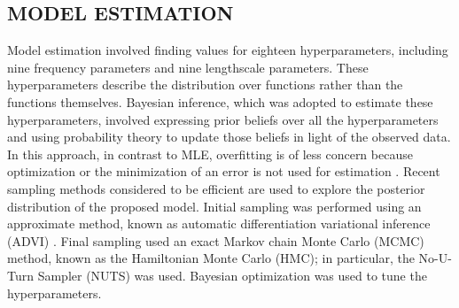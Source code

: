 \documentclass[letterpaper]{article}
\begin{document}

\subsection{MODEL ESTIMATION}\label{model-estimation}

Model estimation involved finding values for eighteen hyperparameters, including nine frequency parameters and nine lengthscale parameters. These hyperparameters describe the distribution over functions rather than the functions themselves. Bayesian inference, which was adopted to estimate these hyperparameters, involved expressing prior beliefs over all the hyperparameters and using probability theory to update those beliefs in light of the observed data. In this approach, in contrast to MLE, overfitting is of less concern because optimization or the minimization of an error is not used for estimation \citep{mchutchon2014nonlinear,ghahramani2015probabilistic}. Recent sampling methods considered to be efficient are used to explore the posterior distribution of the proposed model. Initial sampling was performed using an approximate method, known as automatic differentiation variational inference (ADVI) \citep{kucukelbir2015automatic}. Final sampling used an exact Markov chain Monte Carlo (MCMC) method, known as the Hamiltonian Monte Carlo (HMC); in particular, the No-U-Turn Sampler (NUTS) \citep{hoffman2014no} was used. Bayesian optimization \citep{brochu2010tutorial, emaasit2018simultaneous} was used to tune the hyperparameters.
\end{document}
